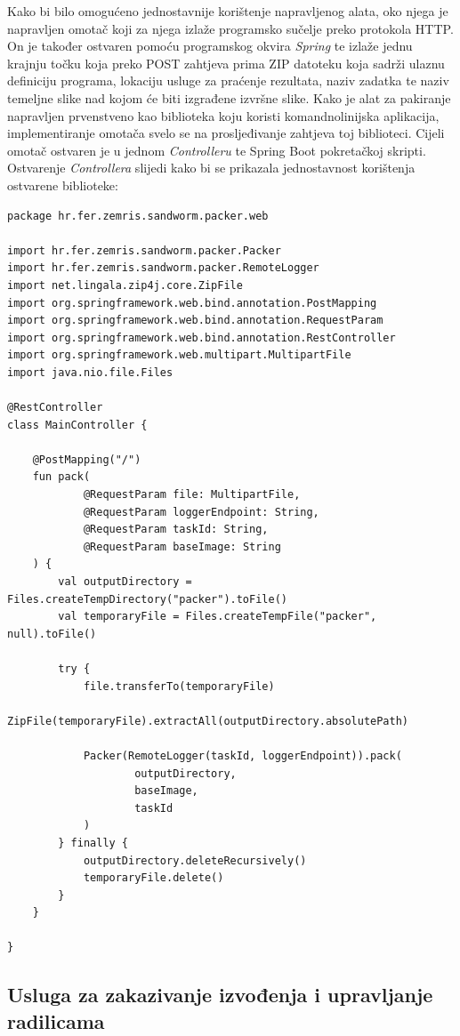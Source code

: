 \documentclass[times, utf8, zavrsni]{fer}
\begin{document}
{Kako bi bilo omogućeno jednostavnije korištenje napravljenog alata, oko njega je napravljen omotač koji za njega izlaže programsko sučelje preko protokola HTTP. On je također ostvaren pomoću programskog okvira {\textit{Spring}} te izlaže jednu krajnju točku koja preko POST zahtjeva prima ZIP datoteku koja sadrži ulaznu definiciju programa, lokaciju usluge za praćenje rezultata, naziv zadatka te naziv temeljne slike nad kojom će biti izgrađene izvršne slike. Kako je alat za pakiranje napravljen prvenstveno kao biblioteka koju koristi komandnolinijska aplikacija, implementiranje omotača svelo se na prosljeđivanje zahtjeva toj biblioteci. Cijeli omotač ostvaren je u jednom {\textit{Controlleru}} te Spring Boot pokretačkoj skripti. Ostvarenje {\textit{Controllera}} slijedi kako bi se prikazala jednostavnost korištenja ostvarene biblioteke:

\begin{lstlisting}
package hr.fer.zemris.sandworm.packer.web

import hr.fer.zemris.sandworm.packer.Packer
import hr.fer.zemris.sandworm.packer.RemoteLogger
import net.lingala.zip4j.core.ZipFile
import org.springframework.web.bind.annotation.PostMapping
import org.springframework.web.bind.annotation.RequestParam
import org.springframework.web.bind.annotation.RestController
import org.springframework.web.multipart.MultipartFile
import java.nio.file.Files

@RestController
class MainController {

    @PostMapping("/")
    fun pack(
            @RequestParam file: MultipartFile,
            @RequestParam loggerEndpoint: String,
            @RequestParam taskId: String,
            @RequestParam baseImage: String
    ) {
        val outputDirectory = Files.createTempDirectory("packer").toFile()
        val temporaryFile = Files.createTempFile("packer", null).toFile()

        try {
            file.transferTo(temporaryFile)
            ZipFile(temporaryFile).extractAll(outputDirectory.absolutePath)

            Packer(RemoteLogger(taskId, loggerEndpoint)).pack(
                    outputDirectory,
                    baseImage,
                    taskId
            )
        } finally {
            outputDirectory.deleteRecursively()
            temporaryFile.delete()
        }
    }

}
\end{lstlisting}

\subsection{Usluga za zakazivanje izvođenja i upravljanje radilicama}

}
\end{document}

